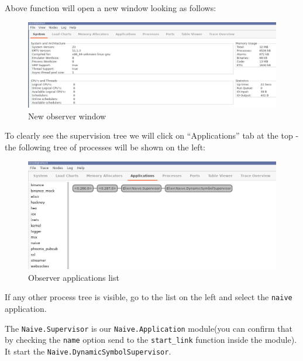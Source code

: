 \documentclass[
]{book}
\newenvironment{Shaded}{\begin{snugshade}}{\end{snugshade}}
\newcommand{\AttributeTok}[1]{\textcolor[rgb]{0.77,0.63,0.00}{#1}}
\newcommand{\ErrorTok}[1]{\textcolor[rgb]{0.64,0.00,0.00}{\textbf{#1}}}
\newcommand{\ExtensionTok}[1]{#1}
\newcommand{\KeywordTok}[1]{\textcolor[rgb]{0.13,0.29,0.53}{\textbf{#1}}}
\newcommand{\NormalTok}[1]{#1}
\newcommand{\OperatorTok}[1]{\textcolor[rgb]{0.81,0.36,0.00}{\textbf{#1}}}
\begin{document}
\begin{Shaded}
\end{Shaded}

Above function will open a new window looking as follows:

\begin{figure}
\centering
\includegraphics{images/chapter_05_06_new_observer.png}
\caption{New observer window}
\end{figure}

To clearly see the supervision tree we will click on ``Applications'' tab at the top - the following tree of processes will be shown on the left:

\begin{figure}
\centering
\includegraphics{images/chapter_05_07_observer_app_list.png}
\caption{Observer applications list}
\end{figure}

If any other process tree is visible, go to the list on the left and select the \texttt{naive} application.

The \texttt{Naive.Supervisor} is our \texttt{Naive.Application} module(you can confirm that by checking the \texttt{name} option send to the \texttt{start\_link} function inside the module). It start the \texttt{Naive.DynamicSymbolSupervisor}.
\end{document}
